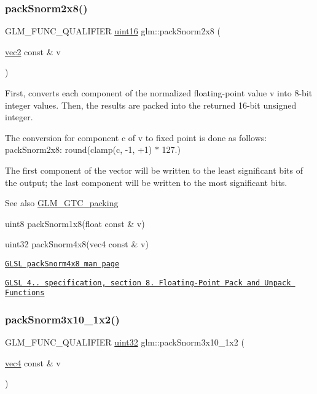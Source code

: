 \subsubsection{\texorpdfstring{pack\+Snorm2x8()}{packSnorm2x8()}}
{\footnotesize\ttfamily G\+L\+M\+\_\+\+F\+U\+N\+C\+\_\+\+Q\+U\+A\+L\+I\+F\+I\+ER \hyperlink{group__gtc__type__precision_gad8c2939e1fdd8e5828b31d95c52255d5}{uint16} glm\+::pack\+Snorm2x8 (\begin{DoxyParamCaption}\item[{\hyperlink{group__core__types_gaa1618f51db67eaa145db101d8c8431d8}{vec2} const \&}]{v }\end{DoxyParamCaption})}

First, converts each component of the normalized floating-\/point value v into 8-\/bit integer values. Then, the results are packed into the returned 16-\/bit unsigned integer.

The conversion for component c of v to fixed point is done as follows\+: pack\+Snorm2x8\+: round(clamp(c, -\/1, +1) $\ast$ 127.)

The first component of the vector will be written to the least significant bits of the output; the last component will be written to the most significant bits.

\begin{DoxySeeAlso}{See also}
\hyperlink{group__gtc__packing}{G\+L\+M\+\_\+\+G\+T\+C\+\_\+packing} 

uint8 pack\+Snorm1x8(float const \& v) 

uint32 pack\+Snorm4x8(vec4 const \& v) 

\href{http://www.opengl.org/sdk/docs/manglsl/xhtml/packSnorm4x8.xml}{\tt G\+L\+SL pack\+Snorm4x8 man page} 

\href{http://www.opengl.org/registry/doc/GLSLangSpec.4.20.8.pdf}{\tt G\+L\+SL 4.. specification, section 8. Floating-\/\+Point Pack and Unpack Functions} 
\end{DoxySeeAlso}
\mbox{\label{group__gtc__packing_ga0d4157cec37c0312216a7be1cc92df54}} 
\subsubsection{\texorpdfstring{pack\+Snorm3x10\+\_\+1x2()}{packSnorm3x10\_1x2()}}
{\footnotesize\ttfamily G\+L\+M\+\_\+\+F\+U\+N\+C\+\_\+\+Q\+U\+A\+L\+I\+F\+I\+ER \hyperlink{group__gtc__type__precision_ga202b6a53c105fcb7e531f9b443518451}{uint32} glm\+::pack\+Snorm3x10\+\_\+1x2 (\begin{DoxyParamCaption}\item[{\hyperlink{group__core__types_ga5881b1b022d7fd1b7218f5916532dd02}{vec4} const \&}]{v }\end{DoxyParamCaption})}


